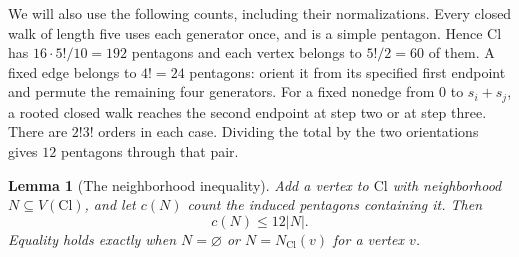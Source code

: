 \documentclass[11pt]{amsart}
\newtheorem{lemma}[theorem]{Lemma}
\theoremstyle{definition}
\theoremstyle{remark}
\begin{document}
We will also use the following counts, including their normalizations.
Every closed walk of length five uses each generator once, and is a
simple pentagon. Hence $\mathrm{Cl}$ has $16\cdot5!/10=192$ pentagons
and each vertex belongs to $5!/2=60$ of them. A fixed edge belongs to
$4!=24$ pentagons: orient it from its specified first endpoint and
permute the remaining four generators. For a fixed nonedge from $0$ to
$s_i+s_j$, a rooted closed walk reaches the second endpoint at step two
or at step three. There are $2!3!$ orders in each case. Dividing the
total by the two orientations gives $12$ pentagons through that pair.

\begin{lemma}[The neighborhood inequality]\label{lem:neighborhood}
Add a vertex to $\mathrm{Cl}$ with neighborhood $N\subseteq V(\mathrm{Cl})$,
and let $c(N)$ count the induced pentagons containing it. Then
\[
 c(N)\leq12|N|.
\]
Equality holds exactly when $N=\varnothing$ or $N=N_{\mathrm{Cl}}(v)$
for a vertex $v$.
\end{lemma}
\end{document}
